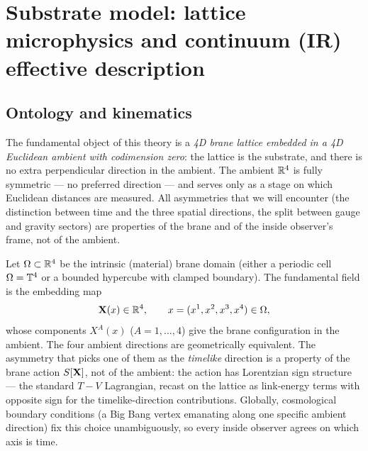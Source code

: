 \section{Substrate model: lattice microphysics and continuum (IR) effective description}
\label{sec:continuum-model}

\subsection{Ontology and kinematics}
\label{subsec:ontology-kinematics}

The fundamental object of this theory is a \emph{4D brane lattice embedded in a 4D Euclidean ambient with codimension zero}: the lattice is the substrate, and there is no extra perpendicular direction in the ambient.
The ambient $\mathbb{R}^4$ is fully symmetric --- no preferred direction --- and serves only as a stage on which Euclidean distances are measured.
All asymmetries that we will encounter (the distinction between time and the three spatial directions, the split between gauge and gravity sectors) are properties of the brane and of the inside observer's frame, not of the ambient.

Let $\Omega\subset\mathbb{R}^4$ be the intrinsic (material) brane domain (either a periodic cell $\Omega=\mathbb{T}^4$ or a bounded hypercube with clamped boundary).
The fundamental field is the embedding map
\begin{equation}
  \mathbf{X}(x)\in\mathbb{R}^4,
  \qquad x=(x^1,x^2,x^3,x^4)\in\Omega,
  \label{eq:fundamental-field}
\end{equation}
whose components $X^A(x)$ ($A=1,\dots,4$) give the brane configuration in the ambient.
The four ambient directions are geometrically equivalent.
The asymmetry that picks one of them as the \emph{timelike} direction is a property of the brane action $S[\mathbf{X}]$, not of the ambient: the action has Lorentzian sign structure --- the standard $T-V$ Lagrangian, recast on the lattice as link-energy terms with opposite sign for the timelike-direction contributions.
Globally, cosmological boundary conditions (a Big Bang vertex emanating along one specific ambient direction) fix this choice unambiguously, so every inside observer agrees on which axis is time.

